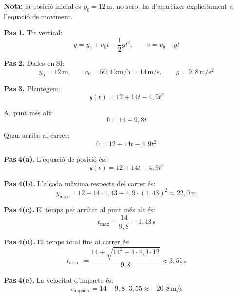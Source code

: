 \documentclass[11pt,a4paper]{article}
\begin{document}
\begin{center}
\end{center}

\textbf{Nota:} la posició inicial és $y_0=12\,\mathrm{m}$, no zero; ha d'aparèixer explícitament a l'equació de moviment.

\begin{solutionbox}
\textbf{Pas 1.} Tir vertical:
\[
y=y_0+v_0t-\frac{1}{2}gt^2, \qquad v=v_0-gt
\]

\textbf{Pas 2.} Dades en SI:
\[
y_0=12\,\mathrm{m}, \qquad v_0=50{,}4\,\mathrm{km/h}=14\,\mathrm{m/s}, \qquad g=9{,}8\,\mathrm{m/s^2}
\]

\textbf{Pas 3.} Plantegem:
\[
y(t)=12+14t-4{,}9t^2
\]

Al punt més alt:
\[
0=14-9{,}8t
\]

Quan arriba al carrer:
\[
0=12+14t-4{,}9t^2
\]

\textbf{Pas 4(a).} L'equació de posició és:
\[
y(t)=12+14t-4{,}9t^2
\]

\textbf{Pas 4(b).} L'alçada màxima respecte del carrer és:
\[
y_{\max}=12+14\cdot 1{,}43-4{,}9\cdot (1{,}43)^2\approx 22{,}0\,\mathrm{m}
\]

\textbf{Pas 4(c).} El temps per arribar al punt més alt és:
\[
t_{\max}=\frac{14}{9{,}8}=1{,}43\,\mathrm{s}
\]

\textbf{Pas 4(d).} El temps total fins al carrer és:
\[
t_{\text{carrer}}=\frac{14+\sqrt{14^2+4\cdot 4{,}9\cdot 12}}{9{,}8}\approx 3{,}55\,\mathrm{s}
\]

\textbf{Pas 4(e).} La velocitat d'impacte és:
\[
v_{\text{impacte}}=14-9{,}8\cdot 3{,}55\approx -20{,}8\,\mathrm{m/s}
\]
\end{solutionbox}
\end{document}
